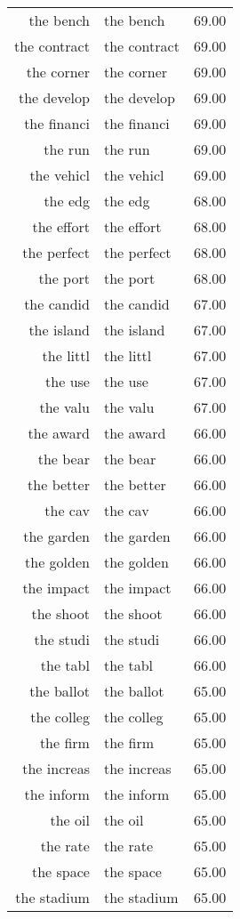 \begin{table}[ht]
\begin{tabular}{rlr}
  the bench & the bench & 69.00 \\ 
  the contract & the contract & 69.00 \\ 
  the corner & the corner & 69.00 \\ 
  the develop & the develop & 69.00 \\ 
  the financi & the financi & 69.00 \\ 
  the run & the run & 69.00 \\ 
  the vehicl & the vehicl & 69.00 \\ 
  the edg & the edg & 68.00 \\ 
  the effort & the effort & 68.00 \\ 
  the perfect & the perfect & 68.00 \\ 
  the port & the port & 68.00 \\ 
  the candid & the candid & 67.00 \\ 
  the island & the island & 67.00 \\ 
  the littl & the littl & 67.00 \\ 
  the use & the use & 67.00 \\ 
  the valu & the valu & 67.00 \\ 
  the award & the award & 66.00 \\ 
  the bear & the bear & 66.00 \\ 
  the better & the better & 66.00 \\ 
  the cav & the cav & 66.00 \\ 
  the garden & the garden & 66.00 \\ 
  the golden & the golden & 66.00 \\ 
  the impact & the impact & 66.00 \\ 
  the shoot & the shoot & 66.00 \\ 
  the studi & the studi & 66.00 \\ 
  the tabl & the tabl & 66.00 \\ 
  the ballot & the ballot & 65.00 \\ 
  the colleg & the colleg & 65.00 \\ 
  the firm & the firm & 65.00 \\ 
  the increas & the increas & 65.00 \\ 
  the inform & the inform & 65.00 \\ 
  the oil & the oil & 65.00 \\ 
  the rate & the rate & 65.00 \\ 
  the space & the space & 65.00 \\ 
  the stadium & the stadium & 65.00 \\ 

\end{tabular}
\end{table}
